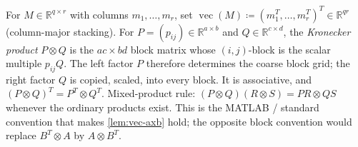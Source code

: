 \documentclass[11pt,a4paper]{article}
\begin{document}
\begin{definition}
\label{def:vec-kronecker}
For \(M\in\mathbb{R}^{q\times r}\) with columns \(m_{1},\ldots,m_{r}\), set \(\operatorname{vec}(M)\coloneqq(m_{1}^{T},\ldots,m_{r}^{T})^{T}\in\mathbb{R}^{qr}\) (column-major stacking). For \(P=(p_{ij})\in\mathbb{R}^{a\times b}\) and \(Q\in\mathbb{R}^{c\times d}\), the \emph{Kronecker product} \(P\otimes Q\) is the \(ac\times bd\) block matrix whose \((i,j)\)-block is the scalar multiple \(p_{ij}Q\). The left factor \(P\) therefore determines the coarse block grid; the right factor \(Q\) is copied, scaled, into every block. It is associative, and \((P\otimes Q)^{T}=P^{T}\otimes Q^{T}\). Mixed-product rule: \((P\otimes Q)(R\otimes S)=PR\otimes QS\) whenever the ordinary products exist. This is the MATLAB / standard convention that makes \cref{lem:vec-axb} hold; the opposite block convention would replace \(B^{T}\otimes A\) by \(A\otimes B^{T}\).
\end{definition}
\end{document}
